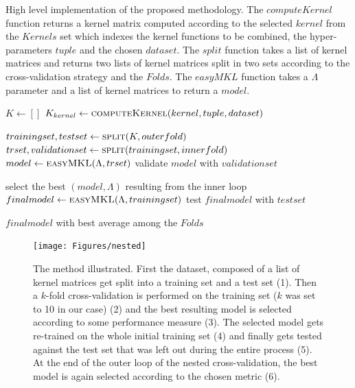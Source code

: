 \begin{algorithm}
    \caption{
        High level implementation of the proposed methodology.
        The $computeKernel$ function returns a kernel matrix computed
        according to the selected $kernel$ from the $Kernels$ set which indexes
        the kernel functions to be combined, the hyper-parameters $tuple$ and the chosen
        $dataset$.
        The $split$ function takes a list of kernel matrices and returns two lists
        of kernel matrices split in two sets according to the cross-validation
        strategy and the $Folds$.
        The $easyMKL$ function takes a $\Lambda$ parameter and a list of kernel
        matrices to return a $model$.
    }
    \label{alg:method}
    \begin{algorithmic}[1]
        \State $K \gets []$
        \label{line:kernels}
                \State $K_{kernel} \gets \Call{computeKernel}{kernel, tuple, dataset}$
            \EndFor
        \EndFor

            \State $trainingset, testset \gets \Call{split}{K, outerfold}$
            \label{line:osubsets}
                    \State $trset, validationset \gets \Call{split}{trainingset, innerfold}$
                    \label{line:isubsets}
                    \State $model \gets \Call{easyMKL}{\Lambda,trset}$
                    \State validate $model$ with $validationset$
                \EndFor
            \EndFor
            
            \State select the best $(model,\Lambda)$ resulting from the inner loop
            \State $finalmodel \gets \Call{easyMKL}{\Lambda,trainingset}$
            \State test $finalmodel$ with $testset$
        \EndFor

        \State \Return $finalmodel$ with best average among the $Folds$
    \end{algorithmic}
\end{algorithm}

\begin{figure}[ht]
    \centering
    \texttt{[image: Figures/nested]}
    \caption{The method illustrated. First the dataset, composed of a list of
    kernel matrices get split into a training set and a test set (1).
    Then a $k$-fold cross-validation is performed on the training set ($k$ was set to
    10 in our case) (2) and the best resulting model is selected according to some
    performance measure (3). The selected model gets re-trained on the whole initial
    training set (4) and finally gets tested against the test set that was left out
    during the entire process (5). At the end of the outer loop of the nested
    cross-validation, the best model is again selected according to the chosen
    metric (6).}
    \label{fig:method}
\end{figure}

